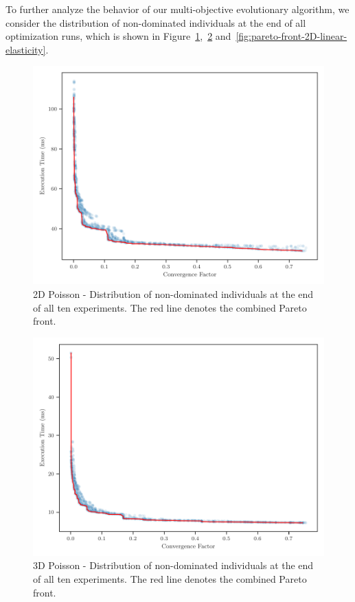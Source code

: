 To further analyze the behavior of our multi-objective evolutionary algorithm, we consider the distribution of non-dominated individuals at the end of all optimization runs, which is shown in Figure~\ref{fig:pareto-front-2D-poisson},~\ref{fig:pareto-front-3D-poisson} and~\ref{fig:pareto-front-2D-linear-elasticity}.
\begin{figure}
	\includegraphics[width=\columnwidth]{figures/pareto_front_2D_FD_Poisson_fromL2.pdf}
	\caption{2D Poisson - Distribution of non-dominated individuals at the end of all ten experiments. The red line denotes the combined Pareto front.}
	\label{fig:pareto-front-2D-poisson}
\end{figure}
\begin{figure}
	\includegraphics[width=\columnwidth]{figures/pareto_front_3D_FD_Poisson_fromL2.pdf}
	\caption{3D Poisson - Distribution of non-dominated individuals at the end of all ten experiments. The red line denotes the combined Pareto front.}
	\label{fig:pareto-front-3D-poisson}
\end{figure}
